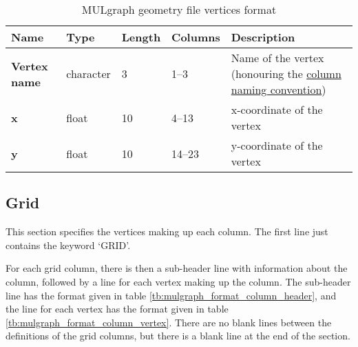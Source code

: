 \begin{table}
  \begin{center}
    \begin{tabular}{|p{20mm}|l|l|l|p{50mm}|}
      \hline
      \textbf{Name} & \textbf{Type} & \textbf{Length} & \textbf{Columns} & \textbf{Description}\\
      \hline
      \textbf{Vertex name} & character & 3 & 1--3 & Name of the vertex (honouring the \hyperref[tb:mulgrid_conventions]{column naming convention})\\
      \hline
      \textbf{x} & float & 10 & 4--13 & x-coordinate of the vertex\\
      \hline
      \textbf{y} & float & 10 & 14--23 & y-coordinate of the vertex\\
      \hline
    \end{tabular}
    \caption{MULgraph geometry file vertices format}
    \label{tb:mulgraph_format_vertices}
  \end{center}
\end{table}

\subsection{Grid}
This section specifies the vertices making up each column. The first line just contains the keyword `GRID'.

For each grid column, there is then a sub-header line with information about the column, followed by a line for each vertex making up the column. The sub-header line has the format given in table \ref{tb:mulgraph_format_column_header}, and the line for each vertex has the format given in table \ref{tb:mulgraph_format_column_vertex}. There are no blank lines between the definitions of the grid columns, but there is a blank line at the end of the section.

